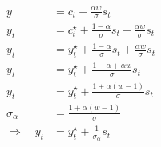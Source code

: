 \begin{align}
    y                     & = c_t + \frac{\alpha w}{\sigma}s_t                                       \\
    y_t                   & = c_t^{\star} + \frac{1-\alpha}{\sigma}s_t + \frac{\alpha w}{\sigma} s_t \\
    y_t                   & = y_t^{\star} + \frac{1-\alpha}{\sigma}s_t + \frac{\alpha w}{\sigma} s_t \\
    y_t                   & = y_t^{\star} + \frac{1-\alpha + \alpha w}{\sigma}s_t                    \\
    y_t                   & = y_t^{\star} + \frac{1+ \alpha(w-1)}{\sigma}s_t                         \\
    \sigma_\alpha         & = \frac{1+ \alpha(w-1)}{\sigma}                                          \\
    \Rightarrow \quad y_t & =y^{\star}_t + \frac{1}{\sigma_\alpha}s_t \label{eq:output_as_world_output_plus_trade}
\end{align}
